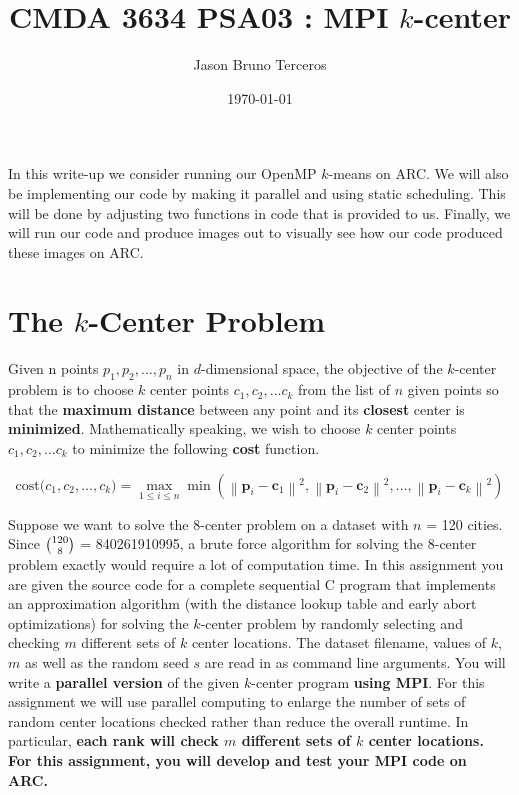 \documentclass[12pt]{article}
\title{CMDA 3634 PSA03 : MPI $k$-center}
\author{Jason Bruno Terceros}
\date{\today}
\begin{document}
\maketitle

In this write-up we consider running our OpenMP $k$-means on ARC. We will also be implementing our code by making it parallel and using static scheduling. This will be done by adjusting two functions in code that is provided to us. Finally, we will run our code and produce images out to visually see how our code produced these images on ARC.


\section{The $k$-Center Problem}

Given n points \textbf{$p_1, p_2, . . . , p_n$} in $d$-dimensional space, the objective of the $k$-center problem is to choose $k$ center points \textbf{$c_1, c_2, . . . c_k$} from the list of $n$ given points so that the \textbf{maximum distance} between any point and its \textbf{closest} center is \textbf{minimized}. Mathematically speaking, we wish to choose $k$ center points \textbf{$c_1, c_2, . . . c_k$} to minimize the following \textbf{cost} function.

\begin{equation}
\text{cost($c_1, c_2, ... , c_k$)} = 
\displaystyle \max _{1\leq i \leq n }\min ( \left\|\mathbf {p}_{i} -{\mathbf{c}}_{1}\right\|^2 , \left\|\mathbf {p}_{i} -{\mathbf{c}}_{2}\right\|^2, ..., \left\|\mathbf {p}_{i} -{\mathbf{c}}_{k}\right\|^2 )
\end{equation}

Suppose we want to solve the 8-center problem on a dataset with $n$ = 120 cities. Since $\tbinom {120}{8}$ = 840261910995, a brute force algorithm for solving the 8-center problem exactly would require a lot of computation time. In this assignment you are given the source code for a complete sequential C program that implements an approximation algorithm (with the distance lookup table and early abort optimizations) for solving the $k$-center problem by randomly selecting and checking $m$ different sets of $k$ center locations. The dataset filename, values of $k$, $m$ as well as the random seed $s$ are read in as command line arguments. You will write a \textbf{parallel version} of the given $k$-center program \textbf{using MPI}. For this assignment we will use parallel computing to enlarge the number of sets of random center locations checked rather than reduce the overall runtime. In particular, \textbf{each rank will check $m$ different sets of $k$ center locations. For this assignment, you will develop and test your MPI code on ARC.}
\end{document}
